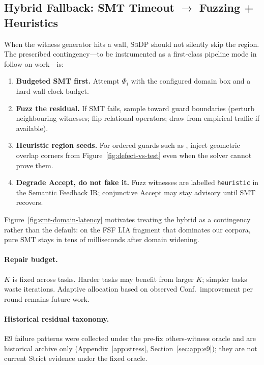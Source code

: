 \subsection{Hybrid Fallback: SMT Timeout $\to$ Fuzzing + Heuristics}
\label{sec:disc:smt-hybrid}

When the witness generator hits a wall, \textsc{SgDP} should not silently skip
the region.
The prescribed contingency---to be instrumented as a first-class pipeline mode
in follow-on work---is:

\begin{enumerate}
  \item \textbf{Budgeted SMT first.} Attempt $\Phi_i$ with the configured
        domain box and a hard wall-clock budget.
  \item \textbf{Fuzz the residual.} If SMT fails, sample toward guard
        boundaries (perturb neighbouring witnesses; flip relational operators;
        draw from empirical traffic if available).
  \item \textbf{Heuristic region seeds.} For ordered guards such as
        , inject geometric overlap corners from
        Figure~\ref{fig:defect-vs-test} even when the solver cannot prove them.
  \item \textbf{Degrade Accept, do not fake it.} Fuzz witnesses are labelled
        \texttt{heuristic} in the Semantic Feedback IR; conjunctive
        $\mathrm{Accept}$ may stay advisory until SMT recovers.
\end{enumerate}

\noindent
Figure~\ref{fig:smt-domain-latency} motivates treating the hybrid as a
contingency rather than the default: on the FSF LIA fragment that dominates
our corpora, pure SMT stays in tens of milliseconds after domain widening.

\paragraph{Repair budget.}
$K$ is fixed across tasks.
Harder tasks may benefit from larger $K$; simpler tasks waste iterations.
Adaptive allocation based on observed Conf.\ improvement per round remains
future work.

\paragraph{Historical residual taxonomy.}
E9 failure patterns were collected under the pre-fix others-witness oracle
and are historical archive only (Appendix~\ref{app:stress},
Section~\ref{sec:app:e9}); they are not current Strict evidence under the
fixed oracle.


